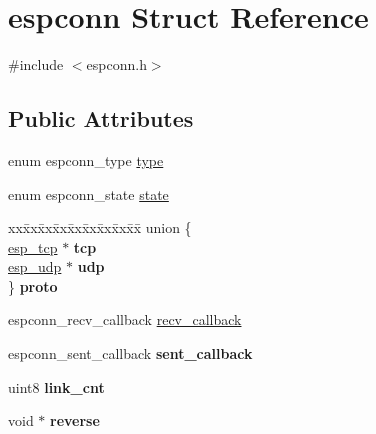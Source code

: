 \hypertarget{structespconn}{}\section{espconn Struct Reference}
\label{structespconn}


{\ttfamily \#include $<$espconn.\+h$>$}

\subsection*{Public Attributes}
\begin{DoxyCompactItemize}
\item 
enum espconn\+\_\+type \hyperlink{structespconn_a393c997ab67360b4e17485123518595c}{type}
\item 
enum espconn\+\_\+state \hyperlink{structespconn_a613ca239a3e312e72b5a593076af30b7}{state}
\item 
\hypertarget{structespconn_afb66ba2a45e0c2c7aa089619d909a335}{}\begin{tabbing}
xx\=xx\=xx\=xx\=xx\=xx\=xx\=xx\=xx\=\kill
union \{\\
\>\hyperlink{struct__esp__tcp}{esp\_tcp} $\ast$ {\bfseries tcp}\\
\>\hyperlink{struct__esp__udp}{esp\_udp} $\ast$ {\bfseries udp}\\
\} {\bfseries proto}\label{structespconn_afb66ba2a45e0c2c7aa089619d909a335}
\\

\end{tabbing}\item 
espconn\+\_\+recv\+\_\+callback \hyperlink{structespconn_a89f6cc886a70f9b844093673f2083f00}{recv\+\_\+callback}
\item 
\hypertarget{structespconn_a945c23f67172f92d557a11ecf78da108}{}espconn\+\_\+sent\+\_\+callback {\bfseries sent\+\_\+callback}\label{structespconn_a945c23f67172f92d557a11ecf78da108}

\item 
\hypertarget{structespconn_a8df3d7d2a7153aa96ce6b022da5050ab}{}uint8 {\bfseries link\+\_\+cnt}\label{structespconn_a8df3d7d2a7153aa96ce6b022da5050ab}

\item 
\hypertarget{structespconn_a7298e6238b12e95329157f5c82f0187e}{}void $\ast$ {\bfseries reverse}\label{structespconn_a7298e6238b12e95329157f5c82f0187e}

\end{DoxyCompactItemize}


